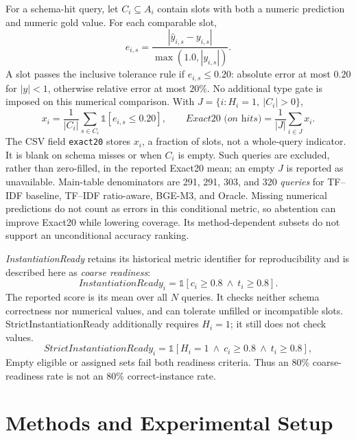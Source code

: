 \documentclass[pdflatex,sn-basic,Numbered]{sn-jnl}
\begin{document}
For a schema-hit query, let $C_i\subseteq A_i$ contain slots with both a numeric prediction and numeric gold value. For each comparable slot,
\begin{equation}
 e_{i,s}=\frac{|\hat{y}_{i,s}-y_{i,s}|}{\max(1.0,|y_{i,s}|)}.
\label{eq:bounded_error}
\end{equation}
A slot passes the inclusive tolerance rule if $e_{i,s}\leq0.20$: absolute error at most $0.20$ for $|y|<1$, otherwise relative error at most $20\%$. No additional type gate is imposed on this numerical comparison. With $J=\{i:H_i=1,\ |C_i|>0\}$,
\begin{equation}
x_i=\frac{1}{|C_i|}\sum_{s\in C_i}\mathbb{1}[e_{i,s}\leq0.20],
\qquad
\textit{Exact20 (on hits)}=\frac{1}{|J|}\sum_{i\in J}x_i.
\label{eq:exact20}
\end{equation}
The CSV field \texttt{exact20} stores $x_i$, a fraction of slots, not a whole-query indicator. It is blank on schema misses or when $C_i$ is empty. Such queries are excluded, rather than zero-filled, in the reported Exact20 mean; an empty $J$ is reported as unavailable. Main-table denominators are 291, 291, 303, and 320 \emph{queries} for TF--IDF baseline, TF--IDF ratio-aware, BGE-M3, and Oracle. Missing numerical predictions do not count as errors in this conditional metric, so abstention can improve Exact20 while lowering coverage. Its method-dependent subsets do not support an unconditional accuracy ranking.

\textit{InstantiationReady} retains its historical metric identifier for reproducibility and is described here as \emph{coarse readiness}:
\begin{equation}
\mathit{InstantiationReady}_i=\mathbb{1}[c_i\geq0.8\ \wedge\ t_i\geq0.8].
\label{eq:instantiation_ready}
\end{equation}
The reported score is its mean over all $N$ queries. It checks neither schema correctness nor numerical values, and can tolerate unfilled or incompatible slots. StrictInstantiationReady additionally requires $H_i=1$; it still does not check values.
\begin{equation}
\mathit{StrictInstantiationReady}_i = \mathbb{1}[H_i=1\ \wedge\ c_i\geq0.8\ \wedge\ t_i\geq0.8],
\label{eq:strict_instantiation_ready}
\end{equation} Empty eligible or assigned sets fail both readiness criteria. Thus an $80\%$ coarse-readiness rate is not an $80\%$ correct-instance rate.

\section{Methods and Experimental Setup}
\label{sec:methodology}\label{sec:method}
\end{document}
